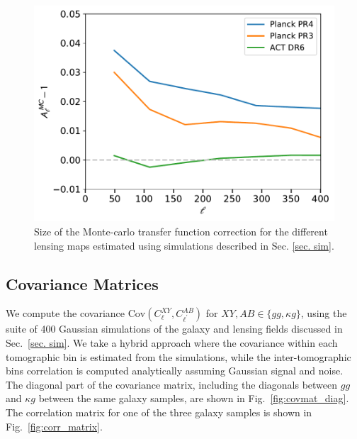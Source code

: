 \documentclass[twocolumn]{aastex631}
\newcommand{\Cov}{{\mathrm{Cov}}}
\begin{document}
{ \begin{figure}
  \includegraphics[width=\linewidth]{figures/transfer.pdf}
  \caption{Size of the Monte-carlo transfer function correction for the different lensing maps estimated using simulations described in Sec. \ref{sec. sim}.}
  \label{fig:transfer}
\end{figure}

\subsection{Covariance Matrices} \label{Sec. covariance}

We compute the covariance $\Cov(C^{XY}_\ell,C^{AB}_{\ell^\prime})$ for $XY,AB \in \{gg,\kappa{g}\}$, using the suite of 400 Gaussian simulations of the galaxy and lensing fields discussed in Sec.~\ref{sec. sim}.  We take a hybrid approach where the covariance within each tomographic bin is estimated from the simulations, while the inter-tomographic bins correlation is computed analytically assuming Gaussian signal and noise.
The diagonal part of the covariance matrix, including the diagonals between $gg$ and $\kappa{g}$ between the same galaxy samples, are shown in Fig.~\ref{fig:covmat_diag}. The correlation matrix for one of the three galaxy samples is shown in Fig.~\ref{fig:corr_matrix}.

}
\end{document}

